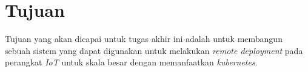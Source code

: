 \section{Tujuan}

Tujuan yang akan dicapai untuk tugas akhir ini adalah untuk membangun sebuah sistem yang dapat digunakan untuk melakukan \textit{remote deployment} pada perangkat \textit{IoT} untuk skala besar dengan memanfaatkan \textit{kubernetes}.

